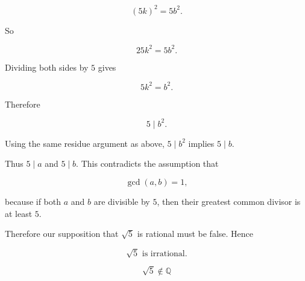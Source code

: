 \[
(5k)^2=5b^2.
\]

So

\[
25k^2=5b^2.
\]

Dividing both sides by \(5\) gives

\[
5k^2=b^2.
\]

Therefore

\[
5\mid b^2.
\]

Using the same residue argument as above, \(5\mid b^2\) implies \(5\mid b\).

Thus \(5\mid a\) and \(5\mid b\). This contradicts the assumption that

\[
\gcd(a,b)=1,
\]

because if both \(a\) and \(b\) are divisible by \(5\), then their greatest common divisor is at least \(5\).

Therefore our supposition that \(\sqrt{5}\) is rational must be false. Hence

\[
\sqrt{5}\text{ is irrational.}
\]

\[
\boxed{\sqrt{5}\notin \mathbb{Q}}
\]